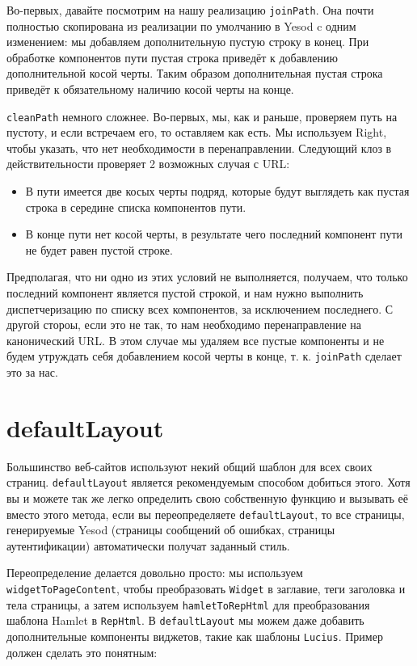Во-первых, давайте посмотрим на нашу реализацию \lstinline!joinPath!. Она почти полностью скопирована из реализации по умолчанию в Yesod c одним изменением: мы добавляем дополнительную пустую строку в конец. При обработке компонентов пути пустая строка приведёт к добавлению дополнительной косой черты. Таким образом дополнительная пустая строка приведёт к обязательному наличию косой черты на конце.

\lstinline!cleanPath! немного сложнее. Во-первых, мы, как и раньше, проверяем путь на пустоту, и если встречаем его, то оставляем как есть. Мы используем Right, чтобы указать, что нет необходимости в перенаправлении. Следующий клоз в действительности проверяет 2 возможных случая с URL:

\begin{itemize}
  \item В пути имеется две косых черты подряд, которые будут выглядеть как пустая строка в середине списка компонентов пути.
  \item В конце пути нет косой черты, в результате чего последний компонент пути не будет равен пустой строке.
\end{itemize}

Предполагая, что ни одно из этих условий не выполняется, получаем, что только последний компонент является пустой строкой, и нам нужно выполнить диспетчеризацию по списку всех компонентов, за исключением последнего. С другой стороы, если это не так, то нам необходимо перенаправление на канонический URL. В этом случае мы удаляем все пустые компоненты и не будем утруждать себя добавлением косой черты в конце, т. к. \lstinline!joinPath! сделает это за нас.

\section {defaultLayout}

Большинство веб-сайтов используют некий общий шаблон для всех своих страниц. \lstinline!defaultLayout! является рекомендуемым способом добиться этого. Хотя вы и можете так же легко определить свою собственную функцию и вызывать её вместо этого метода, если вы переопределяете \lstinline!defaultLayout!, то все страницы, генерируемые Yesod (страницы сообщений об ошибках, страницы аутентификации) автоматически получат заданный стиль.

Переопределение делается довольно просто: мы используем \lstinline!widgetToPageContent!, чтобы преобразовать \lstinline!Widget! в заглавие, теги заголовка и тела страницы, а затем используем \lstinline!hamletToRepHtml! для преобразования шаблона Hamlet в \lstinline!RepHtml!. В \lstinline!defaultLayout! мы можем даже добавить дополнительные компоненты виджетов, такие как шаблоны \lstinline!Lucius!. Пример должен сделать это понятным:

